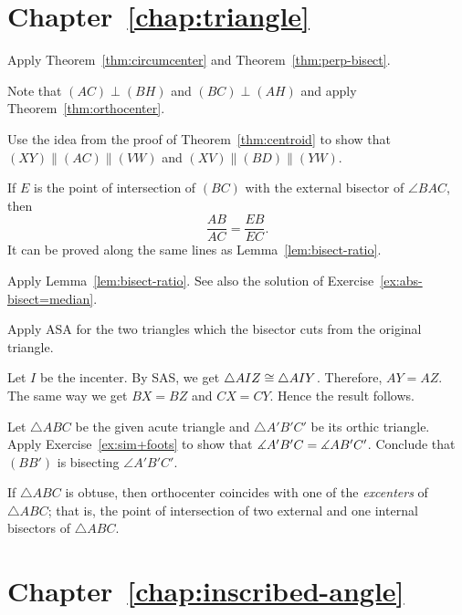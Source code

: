 \section*{Chapter~\ref{chap:triangle}}
\setcounter{eqtn}{0}

Apply Theorem~\ref{thm:circumcenter} and Theorem~\ref{thm:perp-bisect}.


Note that $(AC)\perp (BH)$ and $(BC)\perp (AH)$ and apply Theorem~\ref{thm:orthocenter}.




Use the idea from the proof of Theorem~\ref{thm:centroid}
to show that $(XY)\parallel (AC)\parallel (VW)$ and
$(XV)\parallel (BD)\parallel (YW)$.


If $E$ is the point of intersection of $(BC)$ 
with the external bisector of $\angle BAC$, then 
$$\frac{AB}{AC}=\frac{EB}{EC}.$$
It can be proved along the same lines as Lemma~\ref{lem:bisect-ratio}.

Apply Lemma~\ref{lem:bisect-ratio}.
See also the solution of Exercise~\ref{ex:abs-bisect=median}.


Apply ASA for the two triangles which the bisector cuts from the original triangle. 

Let $I$ be the incenter.
By SAS, we get $\triangle AIZ\z\cong\triangle AIY$. Therefore, $AY=AZ$.
The same way we get $BX=BZ$ and $CX=CY$.
Hence the result follows.

Let $\triangle ABC$ be the given acute triangle and $\triangle A'B'C'$ 
be its orthic triangle.
Apply Exercise~\ref{ex:sim+foots} to show that 
$\measuredangle A'B'C\z=\measuredangle AB'C'$.
Conclude that $(BB')$ is bisecting $\angle A'B'C'$.

If $\triangle ABC$ is obtuse, then orthocenter coincides with one of the \emph{excenters} of $\triangle ABC$;
that is, 
the point of intersection of two external and one internal bisectors of $\triangle ABC$.
 

 

\section*{Chapter~\ref{chap:inscribed-angle}}
\setcounter{eqtn}{0}

